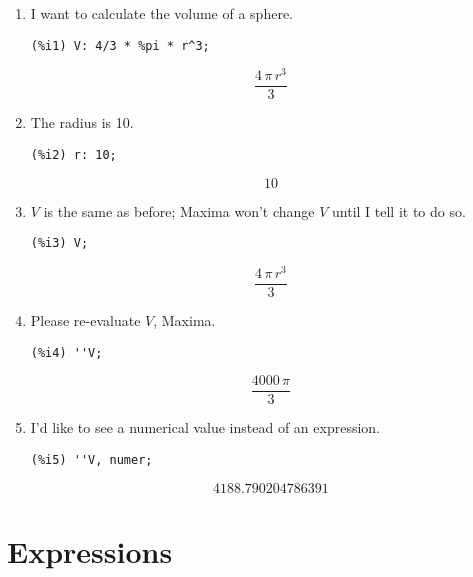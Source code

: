\documentclass[12pt,leqno]{article}
\begin{document}
\begin{enumerate}

\item I want to calculate the volume of a sphere.
\begin{verbatim}
(%i1) V: 4/3 * %pi * r^3;
\end{verbatim}
\begin{equation}
\frac{4\,\pi\,r^3}{3}\tag{\%o1}
\label{eq:doc-group1-code1-1}
\end{equation}

\item The radius is 10.
\begin{verbatim}
(%i2) r: 10;
\end{verbatim}
\begin{equation}
10\tag{\%o2}
\label{eq:doc-group1-code2-1}
\end{equation}

\item $V$ is the same as before; Maxima won't change $V$ until I tell it to do so.
\begin{verbatim}
(%i3) V;
\end{verbatim}
\begin{equation}
\frac{4\,\pi\,r^3}{3}\tag{\%o3}
\label{eq:doc-group1-code3-1}
\end{equation}

\item Please re-evaluate $V$, Maxima.
\begin{verbatim}
(%i4) ''V;
\end{verbatim}
\begin{equation}
\frac{4000\,\pi}{3}\tag{\%o4}
\label{eq:doc-group1-code4-1}
\end{equation}

\item I'd like to see a numerical value instead of an expression.
\begin{verbatim}
(%i5) ''V, numer;
\end{verbatim}
\begin{equation}
4188.790204786391\tag{\%o5}
\label{eq:doc-group1-code5-1}
\end{equation}

\end{enumerate}

\section{Expressions}
\end{document}
